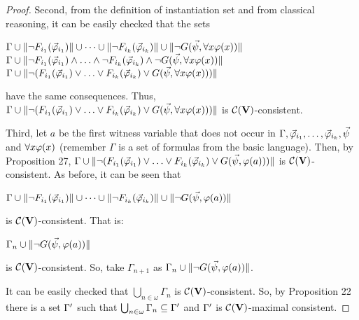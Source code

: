 \begin{proof}
	\qquad Second, from the definition of instantiation set and from classical reasoning, it can be easily checked that the sets  
	
	
	\begin{center}
		$\Gamma \cup \Arrowvert \neg F_{i_{1}}( \vec{\varphi}_{i_{1}}) \Arrowvert \cup \dots \cup\Arrowvert \neg F_{i_{k}}( \vec{\varphi}_{i_{k}}) \Arrowvert \cup \Arrowvert \neg G(\vec{\psi}, \forall x\varphi (x)) \Arrowvert$ \\    
		
		$\Gamma \cup \Arrowvert \nao F_{i_{1}}( \vvarphi_{i_{1}}) \e \dots \e \nao F_{i_{k}}( \vvarphi_{i_{k}}) \e \nao G(\vec{\psi}, \todo x\varphi (x)) \Arrowvert$ \\        
		
		$\Gamma \cup \Arrowvert \nao (F_{i_{1}}( \vvarphi_{i_{1}}) \ou \dots \ou  F_{i_{k}}( \vvarphi_{i_{k}}) \ou  G(\vec{\psi}, \todo x\varphi (x))) \Arrowvert$     
	\end{center}
have the same consequences. Thus, $\Gamma \cup \Arrowvert \nao (F_{i_{1}}( \vvarphi_{i_{1}}) \ou \dots \ou  F_{i_{k}}( \vvarphi_{i_{k}}) \ou  G(\vec{\psi}, \todo x\varphi (x))) \Arrowvert$  is $\mathcal{C}(\textbf{V})$-consistent.
	
	
	\qquad Third, let $a$ be the first witness variable that does not occur in $\Gamma, \vec{\varphi}_{i_{1}},\dots, \vec{\varphi}_{i_{k}}, \vec{\psi}$ and $\forall x \varphi (x)$ (remember $\Gamma$ is a set of formulas from the basic language). Then, by Proposition 27, $\Gamma \cup \Arrowvert \nao (F_{i_{1}}( \vvarphi_{i_{1}}) \ou \dots \ou  F_{i_{k}}( \vvarphi_{i_{k}}) \ou  G(\vec{\psi},\varphi (a))) \Arrowvert$  is $\mathcal{C}(\textbf{V})$-consistent. As before, it can be seen that  
	\begin{center}
		$\Gamma \cup \Arrowvert \neg F_{i_{1}}( \vec{\varphi}_{i_{1}}) \Arrowvert \cup \dots \cup\Arrowvert \neg F_{i_{k}}( \vec{\varphi}_{i_{k}}) \Arrowvert \cup \Arrowvert \neg G(\vec{\psi}, \varphi (a)) \Arrowvert$ \\    
		
	\end{center}
is $\mathcal{C}(\textbf{V})$-consistent. That is:    
	
	
	\begin{center}
		$\Gamma_{n} \cup  \Arrowvert \neg G(\vec{\psi}, \varphi (a)) \Arrowvert$ \\        
	\end{center}
is $\mathcal{C}(\textbf{V})$-consistent. So, take $\Gamma_{n+1}$ as $\Gamma_{n} \cup \Arrowvert \neg G(\vec{\psi}, \varphi (a)) \Arrowvert$.
	
	\qquad It can be easily checked that $\bigcup_{n\in \omega} \Gamma_{n}$ is $\mathcal{C}(\textbf{V})$-consistent. So, by Proposition 22 there is a set $\Gamma^{\prime}$ such that  $\bigcup_{n\in \omega} \Gamma_{n} \subseteq\Gamma^{\prime}$ and $\Gamma^{\prime}$ is $\mathcal{C}(\textbf{V})$-maximal consistent. 
	

\end{proof}
